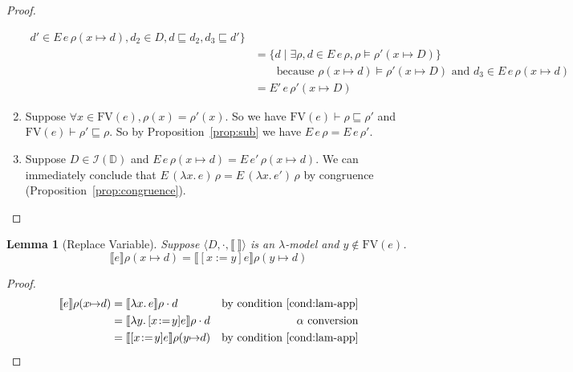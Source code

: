 \documentclass{tufte-handout}
\newcommand{\SEM}[1]{\llbracket #1 \rrbracket}
\newcommand{\LAM}[1]{\lambda #1.\,}
\newcommand{\by}[0]{\!:=\!}
\newcommand{\ext}[3]{#3(#1{\mapsto}#2)}
\newtheorem{lemma}[theorem]{Lemma}
\begin{document}
\begin{proof}
\begin{enumerate}
\begin{align*}
                   d' \in E\,e\,\ext{x}{d}{\rho},
                  d_2 \in D, d \sqsubseteq d_2, d_3 \sqsubseteq d' \} \\
   &= \{ d \mid \exists \rho, d \in E\,e\,\rho, \rho \models \ext{x}{D}{\rho'}\} \\
   & \qquad\text{because } \ext{x}{d}{\rho}\models\ext{x}{D}{\rho'}
      \text{ and }
      d_3 \in E\,e\,\ext{x}{d}{\rho} \\
   &= E'\,e\,\ext{x}{D}{\rho'}
  \end{align*}
\item Suppose $\forall x \in \mathrm{FV}(e), \rho(x) = \rho'(x)$.
   So we have $\mathrm{FV}(e) \vdash \rho \sqsubseteq \rho'$
   and $\mathrm{FV}(e) \vdash \rho' \sqsubseteq \rho$.
   So by Proposition~\ref{prop:sub} we have $E\,e\,\rho = E\,e\,\rho'$.

\item Suppose $D \in \mathcal{I}(\mathbb{D})$ and
  $E\,e\,\ext{x}{d}{\rho} = E\,e'\,\ext{x}{d}{\rho}$. 
  We can immediately conclude that
  $E\,(\LAM{x}e)\,\rho = E\,(\LAM{x}e')\,\rho$
  by congruence (Proposition~\ref{prop:congruence}).
  
\end{enumerate}
\end{proof}


\begin{lemma}[Replace Variable]
  \label{lem:change-var}
  Suppose $\langle D,\cdot, \SEM{\ } \rangle$ is an $\lambda$-model
  and $y \notin \mathrm{FV}(e)$.
  \[
    \SEM{e} \ext{x}{ d}{\rho}
    = 
    \SEM{[x\by y]e} \ext{y}{ d}{\rho}
  \]
\end{lemma}
\begin{proof}
  \begin{align*}
    \SEM{e} \ext{x}{ d}{\rho} &= \SEM{\LAM{x}e}\rho \cdot d & \text{by condition \ref{cond:lam-app}}\\
       &= \SEM{\LAM{y}[x\by y]e}\rho \cdot d & \text{$\alpha$ conversion}\\
       &= \SEM{[x\by y]e} \ext{y}{ d}{\rho} & \text{by condition \ref{cond:lam-app}}
  \end{align*}
\end{proof}
\end{document}
